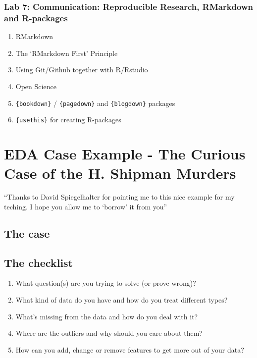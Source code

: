 \documentclass[]{book}
\providecommand{\tightlist}{%
  \setlength{\itemsep}{0pt}\setlength{\parskip}{0pt}}
\begin{document}
\hypertarget{lab-7-communication-reproducible-research-rmarkdown-and-r-packages}{%
\subsection{Lab 7: Communication: Reproducible Research, RMarkdown and R-packages}\label{lab-7-communication-reproducible-research-rmarkdown-and-r-packages}}

\begin{enumerate}
\def\labelenumi{\arabic{enumi}.}
\tightlist
\item
  RMarkdown
\item
  The `RMarkdown First' Principle
\item
  Using Git/Github together with R/Rstudio
\item
  Open Science
\item
  \texttt{\{bookdown\}} / \texttt{\{pagedown\}} and \texttt{\{blogdown\}} packages
\item
  \texttt{\{usethis\}} for creating R-packages
\end{enumerate}

\hypertarget{eda_case}{%
\chapter{EDA Case Example - The Curious Case of the H. Shipman Murders}\label{eda_case}}

``Thanks to David Spiegelhalter for pointing me to this nice example for my teching. I hope you allow me to `borrow' it from you''\citep{spiegelhalter2019}

\hypertarget{the-case}{%
\section{The case}\label{the-case}}

\hypertarget{the-checklist}{%
\section{The checklist}\label{the-checklist}}

\begin{enumerate}
\def\labelenumi{\arabic{enumi}.}
\tightlist
\item
  What question(s) are you trying to solve (or prove wrong)?
\item
  What kind of data do you have and how do you treat different types?
\item
  What's missing from the data and how do you deal with it?
\item
  Where are the outliers and why should you care about them?
\item
  How can you add, change or remove features to get more out of your data?
\end{enumerate}
\end{document}
